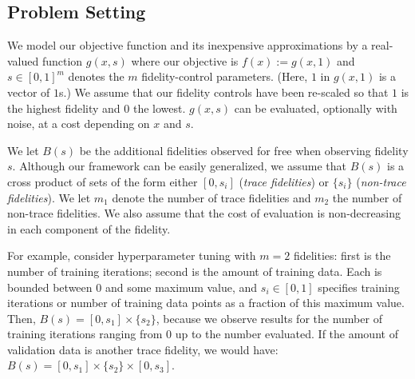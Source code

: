 \documentclass[letterpaper]{article}
\newcommand{\taKG}{\text{taKG}}
\newcommand{\taKGE}{\text{taKG}^\emptyset}
\numberwithin{equation}{section}
\let\Section\S
\renewcommand{\S}{\mathcal{S}}
\newcommand{\sectn}[1]{\Section\ref{#1}}
\begin{document}



\subsection{Problem Setting}
\label{sec:obj}
We model our objective function and its inexpensive approximations by a real-valued function $g(x, s)$ where our objective is $f(x) := g(x, 1)$ and $s \in [0,1]^m$ denotes the $m$ fidelity-control parameters.   (Here, $1$ in $g(x,1)$ is a vector of $1$s.)  
We assume that our fidelity controls have been re-scaled so that $1$ is the highest fidelity and $0$ the lowest.  
$g(x,s)$ can be evaluated, optionally with noise, at a cost depending on $x$ and $s$. 

We let $B(s)$ be the additional fidelities observed for free when observing fidelity $s$.  Although our framework can be easily generalized, we assume that $B(s)$ is a cross product of sets of the form either $[0,s_i]$ (\emph{trace fidelities}) or $\{s_i\}$ (\emph{non-trace fidelities}). 
We let $m_1$ denote the number of trace fidelities and $m_2$ the number of non-trace fidelities.
We also assume that the cost of evaluation is non-decreasing in each component of the fidelity.

For example, consider hyperparameter tuning with $m=2$ fidelities: first is the number of training iterations; %
second is the amount of training data.  %
Each is bounded between $0$ and some maximum value, and $s_i \in [0,1]$ specifies training iterations or number of training data points as a fraction of this maximum value.
Then, $B(s) = [0,s_1] \times \{s_2\}$, because we observe results for the number of training iterations ranging from $0$ up to the number evaluated.  
If the amount of validation data is another trace fidelity, we would have: $B(s) = [0,s_1] \times \{s_2\} \times [0,s_3]$. 
\end{document}
